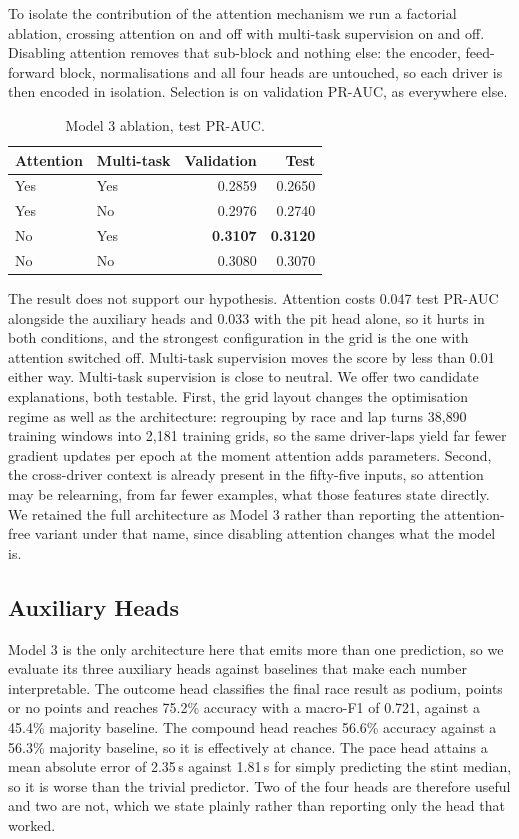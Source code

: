 \documentclass[conference]{IEEEtran}
\begin{document}
To isolate the contribution of the attention mechanism we run a factorial ablation, crossing attention on and off with multi-task supervision on and off. Disabling attention removes that sub-block and nothing else: the encoder, feed-forward block, normalisations and all four heads are untouched, so each driver is then encoded in isolation. Selection is on validation PR-AUC, as everywhere else.

\begin{table}[t]
\centering
\caption{Model 3 ablation, test PR-AUC.}
\label{tab:ablation}
\small
\begin{tabular}{llrr}
\toprule
Attention & Multi-task & Validation & Test \\
\midrule
Yes & Yes & 0.2859 & 0.2650 \\
Yes & No  & 0.2976 & 0.2740 \\
No  & Yes & \textbf{0.3107} & \textbf{0.3120} \\
No  & No  & 0.3080 & 0.3070 \\
\bottomrule
\end{tabular}
\end{table}

The result does not support our hypothesis. Attention costs 0.047 test PR-AUC alongside the auxiliary heads and 0.033 with the pit head alone, so it hurts in both conditions, and the strongest configuration in the grid is the one with attention switched off. Multi-task supervision moves the score by less than 0.01 either way. Multi-task supervision is close to neutral. We offer two candidate explanations, both testable. First, the grid layout changes the optimisation regime as well as the architecture: regrouping by race and lap turns 38{,}890 training windows into 2{,}181 training grids, so the same driver-laps yield far fewer gradient updates per epoch at the moment attention adds parameters. Second, the cross-driver context is already present in the fifty-five inputs, so attention may be relearning, from far fewer examples, what those features state directly. We retained the full architecture as Model 3 rather than reporting the attention-free variant under that name, since disabling attention changes what the model is.

\subsection{Auxiliary Heads}

Model 3 is the only architecture here that emits more than one prediction, so we evaluate its three auxiliary heads against baselines that make each number interpretable. The outcome head classifies the final race result as podium, points or no points and reaches 75.2\% accuracy with a macro-F1 of 0.721, against a 45.4\% majority baseline. The compound head reaches 56.6\% accuracy against a 56.3\% majority baseline, so it is effectively at chance. The pace head attains a mean absolute error of 2.35\,s against 1.81\,s for simply predicting the stint median, so it is worse than the trivial predictor. Two of the four heads are therefore useful and two are not, which we state plainly rather than reporting only the head that worked.
\end{document}
